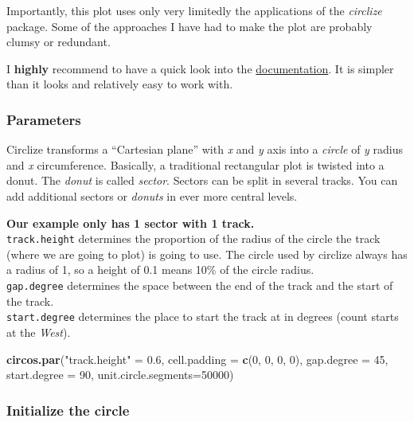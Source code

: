 \documentclass[
]{article}
\newenvironment{Shaded}{\begin{snugshade}}{\end{snugshade}}
\newcommand{\DataTypeTok}[1]{\textcolor[rgb]{0.13,0.29,0.53}{#1}}
\newcommand{\DecValTok}[1]{\textcolor[rgb]{0.00,0.00,0.81}{#1}}
\newcommand{\FloatTok}[1]{\textcolor[rgb]{0.00,0.00,0.81}{#1}}
\newcommand{\KeywordTok}[1]{\textcolor[rgb]{0.13,0.29,0.53}{\textbf{#1}}}
\newcommand{\NormalTok}[1]{#1}
\newcommand{\StringTok}[1]{\textcolor[rgb]{0.31,0.60,0.02}{#1}}
\begin{document}
Importantly, this plot uses only very limitedly the applications of the
\emph{circlize} package. Some of the approaches I have had to make the
plot are probably clumsy or redundant.

I \textbf{highly} recommend to have a quick look into the
\href{https://jokergoo.github.io/circlize_book/book/}{documentation}. It
is simpler than it looks and relatively easy to work with.

\hypertarget{parameters}{%
\subsubsection{Parameters}\label{parameters}}

Circlize transforms a ``Cartesian plane'' with \emph{x} and \emph{y}
axis into a \emph{circle} of \emph{y} radius and \emph{x} circumference.
Basically, a traditional rectangular plot is twisted into a donut. The
\emph{donut} is called \emph{sector}. Sectors can be split in several
tracks. You can add additional sectors or \emph{donuts} in ever more
central levels.

\textbf{Our example only has 1 sector with 1 track.}\\
\texttt{track.height} determines the proportion of the radius of the
circle the track (where we are going to plot) is going to use. The
circle used by circlize always has a radius of 1, so a height of 0.1
means 10\% of the circle radius.\\
\texttt{gap.degree} determines the space between the end of the track
and the start of the track.\\
\texttt{start.degree} determines the place to start the track at in
degrees (count starts at the \emph{West}).

\begin{Shaded}
\begin{Highlighting}[]
\KeywordTok{circos.par}\NormalTok{(}\StringTok{"track.height"}\NormalTok{ =}\StringTok{ }\FloatTok{0.6}\NormalTok{, }
           \DataTypeTok{cell.padding =} \KeywordTok{c}\NormalTok{(}\DecValTok{0}\NormalTok{, }\DecValTok{0}\NormalTok{, }\DecValTok{0}\NormalTok{, }\DecValTok{0}\NormalTok{),}
           \DataTypeTok{gap.degree =} \DecValTok{45}\NormalTok{,}
           \DataTypeTok{start.degree =} \DecValTok{90}\NormalTok{,}
           \DataTypeTok{unit.circle.segments=}\DecValTok{50000}\NormalTok{)}
\end{Highlighting}
\end{Shaded}

\hypertarget{initialize-the-circle}{%
\subsubsection{Initialize the circle}\label{initialize-the-circle}}
\end{document}
